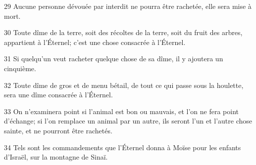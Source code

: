 \par 29 Aucune personne dévouée par interdit ne pourra être rachetée, elle sera mise à mort.
\par 30 Toute dîme de la terre, soit des récoltes de la terre, soit du fruit des arbres, appartient à l'Éternel; c'est une chose consacrée à l'Éternel.
\par 31 Si quelqu'un veut racheter quelque chose de sa dîme, il y ajoutera un cinquième.
\par 32 Toute dîme de gros et de menu bétail, de tout ce qui passe sous la houlette, sera une dîme consacrée à l'Éternel.
\par 33 On n'examinera point si l'animal est bon ou mauvais, et l'on ne fera point d'échange; si l'on remplace un animal par un autre, ils seront l'un et l'autre chose sainte, et ne pourront être rachetés.
\par 34 Tels sont les commandements que l'Éternel donna à Moïse pour les enfants d'Israël, sur la montagne de Sinaï.


